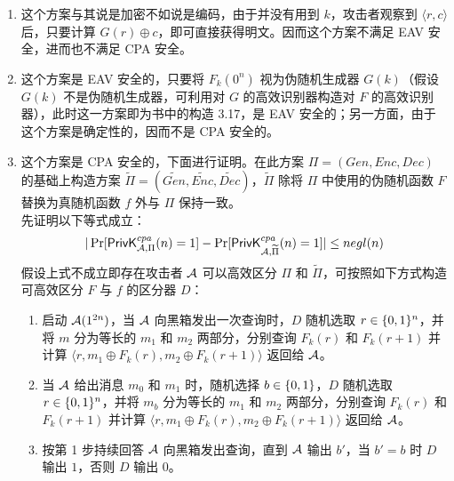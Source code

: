 \begin{questions}
        \begin{solution}
            \begin{enumerate}
                \item 这个方案与其说是加密不如说是编码，由于并没有用到 $k$，攻击者观察到 $\langle{r,c}\rangle$ 后，只要计算 $G(r)\oplus{c}$，即可直接获得明文。因而这个方案不满足 EAV 安全，进而也不满足 CPA 安全。
                \item 这个方案是 EAV 安全的，只要将 $F_k(0^n)$ 视为伪随机生成器 $G(k)$（假设 $G(k)$ 不是伪随机生成器，可利用对 $G$ 的高效识别器构造对 $F$ 的高效识别器），此时这一方案即为书中的构造 3.17，是 EAV 安全的；另一方面，由于这个方案是确定性的，因而不是 CPA 安全的。
                \item 这个方案是 CPA 安全的，下面进行证明。在此方案 $\Pi=(Gen,Enc,Dec)$ 的基础上构造方案 $\widetilde{\Pi}=(\widetilde{Gen},\widetilde{Enc},\widetilde{Dec})$，$\widetilde{\Pi}$ 除将 $\Pi$ 中使用的伪随机函数 $F$ 替换为真随机函数 $f$ 外与 $\Pi$ 保持一致。\\
                先证明以下等式成立：
                \begin{equation}
                    \label{equal-3}
                    \begin{aligned}
                        |\Pr[\mathsf{PrivK}^{cpa}_{\mathcal{A},\Pi}(n)=1]-\Pr[\mathsf{PrivK}^{cpa}_{\mathcal{A},\widetilde{\Pi}}(n)=1]|\leq{negl}(n)
                    \end{aligned}
                \end{equation}
                假设上式不成立即存在攻击者 $\mathcal{A}$ 可以高效区分 $\Pi$ 和 $\widetilde{\Pi}$，可按照如下方式构造可高效区分 $F$ 与 $f$ 的区分器 $D$：
                \begin{enumerate}
                    \item 启动 $\mathcal{A}(1^{2n})$，当 $\mathcal{A}$ 向黑箱发出一次查询时，$D$ 随机选取 $r\in\{{0,1}\}^n$，并将 $m$ 分为等长的 $m_1$ 和 $m_2$ 两部分，分别查询 $F_k(r)$ 和 $F_k(r+1)$ 并计算 $\langle{r,m_1\oplus{F_k(r)},m_2\oplus{F_k(r+1)}}\rangle$ 返回给 $\mathcal{A}$。
                    \item 当 $\mathcal{A}$ 给出消息 $m_0$ 和 $m_1$ 时，随机选择 $b\in\{{0,1}\}$，$D$ 随机选取 $r\in\{{0,1}\}^n$，并将 $m_b$ 分为等长的 $m_1$ 和 $m_2$ 两部分，分别查询 $F_k(r)$ 和 $F_k(r+1)$ 并计算 $\langle{r,m_1\oplus{F_k(r)},m_2\oplus{F_k(r+1)}}\rangle$ 返回给 $\mathcal{A}$。
                    \item 按第 1 步持续回答 $\mathcal{A}$ 向黑箱发出查询，直到 $\mathcal{A}$ 输出 $b'$，当 $b'=b$ 时 $D$ 输出 $1$，否则 $D$ 输出 $0$。
                \end{enumerate}

\end{enumerate}
\end{solution}
\end{questions}
